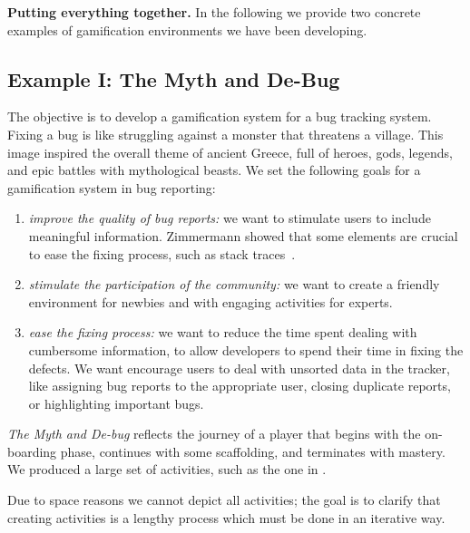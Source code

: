 {\bf Putting everything together.} In the following we provide two concrete examples of gamification environments we have been developing.

\subsection{Example I: The Myth and De-Bug}\label{sec:gamification-example-bugs}

The objective is to develop a gamification system for a bug tracking system.
Fixing a bug is like struggling against a monster that threatens a village.
This image inspired the overall theme of ancient Greece, full of heroes, gods, legends, and epic battles with mythological beasts.
We set the following goals for a gamification system in bug reporting:
\begin{enumerate}[(1)]
	\item {\em improve the quality of bug reports:} we want to stimulate users to include meaningful information.
Zimmermann \etal showed that some elements are crucial to ease the fixing process, such as stack traces~\cite{Zimm2010a}.
	\item {\em stimulate the participation of the community:} we want to create a friendly environment for newbies and with engaging activities for experts.
	\item {\em ease the fixing process:} we want to reduce the time spent dealing with cumbersome information, to allow developers to spend their time in fixing the defects.
We want encourage users to deal with unsorted data in the tracker, like assigning bug reports to the appropriate user, closing duplicate reports, or highlighting important bugs.
\end{enumerate}

\textit{The Myth and De-bug} reflects the journey of a player that begins with the on-boarding phase, continues with some scaffolding, and terminates with mastery.
We produced a large set of activities, such as the one in .


Due to space reasons we cannot depict all activities; the goal is to clarify that creating activities is a lengthy process which must be done in an iterative way.

